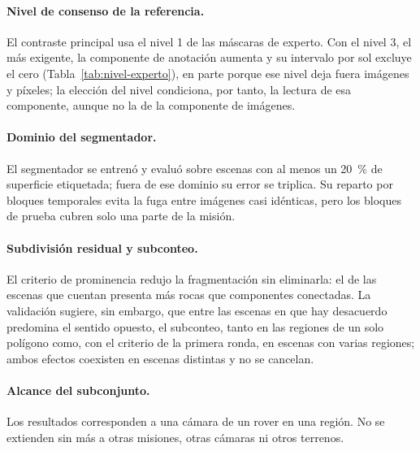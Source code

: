 \paragraph{Nivel de consenso de la referencia.} El contraste principal usa el nivel 1 de las
máscaras de experto. Con el nivel 3, el más exigente, la componente de anotación aumenta y su
intervalo por sol excluye el cero (Tabla~\ref{tab:nivel-experto}), en parte porque ese nivel
deja fuera imágenes y píxeles; la elección del nivel condiciona, por tanto, la lectura de esa
componente, aunque no la de la componente de imágenes.

\paragraph{Dominio del segmentador.} El segmentador se entrenó y evaluó sobre escenas con al
menos un \SI{20}{\percent} de superficie etiquetada; fuera de ese dominio su error se triplica.
Su reparto por bloques temporales evita la fuga entre imágenes casi idénticas, pero los bloques
de prueba cubren solo una parte de la misión.

\paragraph{Subdivisión residual y subconteo.} El criterio de prominencia redujo la
fragmentación sin eliminarla: el \cPctSubdiv{} de las escenas que cuentan presenta más rocas
que componentes conectadas. La validación sugiere, sin embargo, que entre las escenas en que hay
desacuerdo predomina el sentido opuesto, el subconteo, tanto en las regiones de un solo polígono
como, con el criterio de la primera ronda, en escenas con varias regiones; ambos efectos
coexisten en escenas distintas y no se cancelan.

\paragraph{Alcance del subconjunto.} Los resultados corresponden a una cámara de un rover en una
región. No se extienden sin más a otras misiones, otras cámaras ni otros terrenos.
